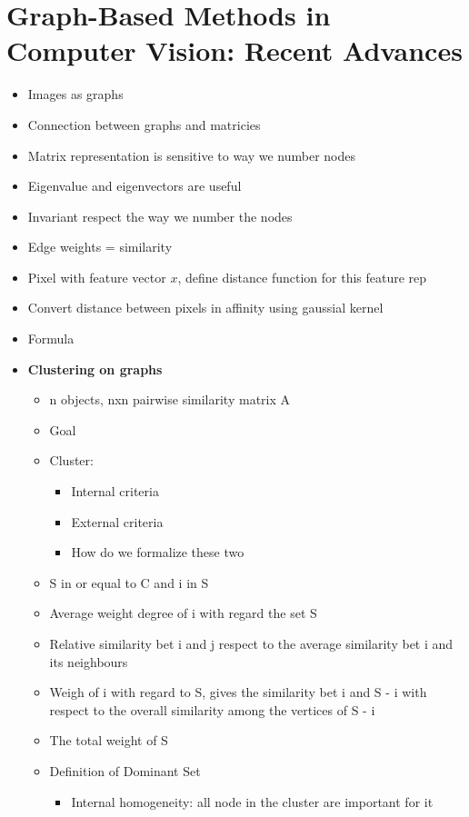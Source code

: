 \documentclass[12pt,oneside]{report}
\begin{document}
\chapter{Graph-Based Methods in Computer Vision: Recent Advances}
\begin{itemize}
    \item Images as graphs
    \item Connection between graphs and matricies
    \item Matrix representation is sensitive to way we number nodes
    \item Eigenvalue and eigenvectors are useful
    \item Invariant respect the way we number the nodes
    \item Edge weights = similarity
    \item Pixel with feature vector \(x\), define distance function for this feature rep
    \item Convert distance between pixels in affinity using gaussial kernel
    \item Formula
    \item \textbf{Clustering on graphs}
    \begin{itemize}
        \item n objects, nxn pairwise similarity matrix A
        \item Goal
        \item Cluster:
        \begin{itemize}
            \item Internal criteria
            \item External criteria
            \item How do we formalize these two
        \end{itemize}
        \item S in or equal to C and i in S
        \item Average weight degree of i with regard the set S
        \item Relative similarity bet i and j respect to the average similarity bet i and its neighbours
        \item Weigh of i with regard to S, gives the similarity bet i and S - i with respect to the overall similarity among the vertices of S - i
        \item The total weight of S 
        \item Definition of Dominant Set
        \begin{itemize}
            \item Internal homogeneity: all node in the cluster are important for it

\end{itemize}
\end{itemize}
\end{itemize}
\end{document}

